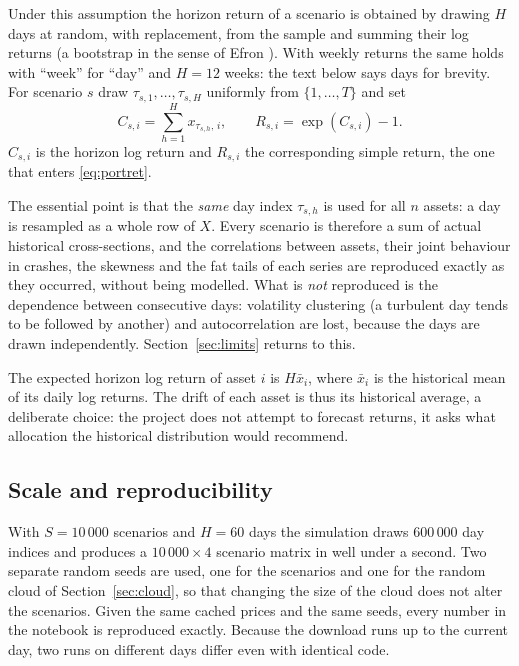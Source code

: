 \documentclass[11pt,a4paper]{article}
\theoremstyle{plain}
\theoremstyle{remark}
\begin{document}
Under this assumption the horizon return of a scenario is obtained by
drawing $H$ days at random, with replacement, from the sample and summing
their log returns (a bootstrap in the sense of Efron \cite{efron}). With
weekly returns the same holds with ``week'' for ``day'' and $H = 12$ weeks:
the text below says days for brevity. For
scenario $s$ draw $\tau_{s,1},\dots,\tau_{s,H}$ uniformly from
$\{1,\dots,T\}$ and set
\begin{equation}
  C_{s,i} = \sum_{h=1}^{H} x_{\tau_{s,h},\,i}, \qquad
  R_{s,i} = \exp(C_{s,i}) - 1 .
  \label{eq:bootstrap}
\end{equation}
$C_{s,i}$ is the horizon log return and $R_{s,i}$ the corresponding simple
return, the one that enters \eqref{eq:portret}.

The essential point is that the \emph{same} day index $\tau_{s,h}$ is used
for all $n$ assets: a day is resampled as a whole row of $X$. Every
scenario is therefore a sum of actual historical cross-sections, and the
correlations between assets, their joint behaviour in crashes, the
skewness and the fat tails of each series are reproduced exactly as they
occurred, without being modelled. What is \emph{not} reproduced is the
dependence between consecutive days: volatility clustering (a turbulent day
tends to be followed by another) and autocorrelation are lost, because the
days are drawn independently. Section~\ref{sec:limits} returns to this.

The expected horizon log return of asset $i$ is $H\bar x_i$, where $\bar x_i$
is the historical mean of its daily log returns. The drift of each asset is
thus its historical average, a deliberate choice: the project does not
attempt to forecast returns, it asks what allocation the historical
distribution would recommend.

\subsection{Scale and reproducibility}

With $S = 10\,000$ scenarios and $H = 60$ days the simulation draws
$600\,000$ day indices and produces a $10\,000\times 4$ scenario matrix in
well under a second. Two separate random seeds are used, one for the
scenarios and one for the random cloud of Section~\ref{sec:cloud}, so that
changing the size of the cloud does not alter the scenarios. Given the same
cached prices and the same seeds, every number in the notebook is reproduced
exactly. Because the download runs up to the current day, two runs on
different days differ even with identical code.
\end{document}
